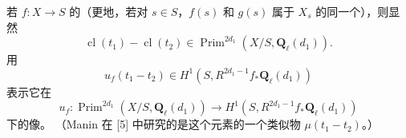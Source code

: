 若 $f:X\to S$ 的（更地，若对 $s\in S$，$f(s)$ 和 $g(s)$ 属于 $X_s$ 的同一个），则显然
\begin{equation}\tag{1.6.2}
\operatorname{cl}(t_1)-\operatorname{cl}(t_2)\in\operatorname{Prim}^{2d_1}(X/S,\mathbf Q_\ell(d_1)).
\end{equation}
用
\begin{equation}\tag{1.5.3}
u_f(t_1-t_2)\in H^1(S,R^{2d_1-1}f_*\mathbf Q_\ell(d_1))
\end{equation}
表示它在
\begin{equation}\tag{1.6.4}
u_f:\operatorname{Prim}^{2d_1}(X/S,\mathbf Q_\ell(d_1))\longrightarrow H^1(S,R^{2d_1-1}f_*\mathbf Q_\ell(d_1))
\end{equation}
下的像。
（Manin 在 [5] 中研究的是这个元素的一个类似物 $\mu(t_1-t_2)$。）

